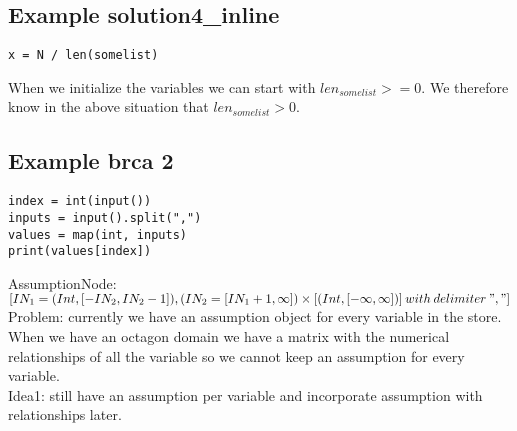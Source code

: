 \documentclass[11pt]{article}
\begin{document}
\subsection{Example solution4\_inline}
\begin{lstlisting}
x = N / len(somelist)
\end{lstlisting}

When we initialize the variables we can start with $len_{somelist} >= 0$. We therefore know in the above situation that $len_{somelist} > 0$.


\subsection{Example brca 2}
\begin{lstlisting}
index = int(input())
inputs = input().split(",")
values = map(int, inputs)
print(values[index])
\end{lstlisting}


AssumptionNode: $[IN_1 = (Int, [-IN_2, IN_2-1]), (IN_2 = [IN_1+1, \infty]) \times [(Int, [-\infty, \infty])]\:with\:delimiter\:","]$\\


Problem: currently we have an assumption object for every variable in the store. When we have an octagon domain we have a matrix with the numerical relationships of all the variable so we cannot keep an assumption for every variable.\\
Idea1: still have an assumption per variable and incorporate assumption with relationships later.
\end{document}
